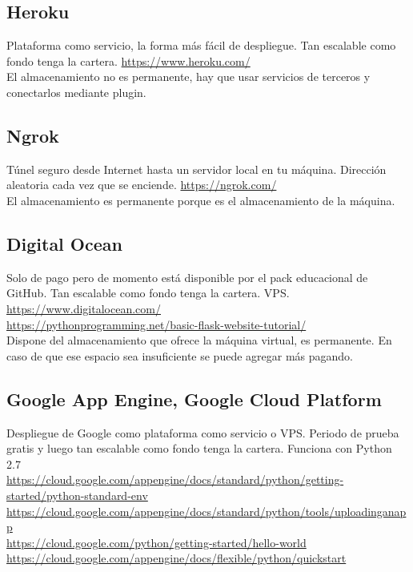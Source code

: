 \subsection{Heroku}
Plataforma como servicio, la forma más fácil de despliegue. Tan escalable como
fondo tenga la cartera. \url{https://www.heroku.com/}\\

El almacenamiento no es permanente, hay que usar servicios de terceros y
conectarlos mediante plugin.
\subsection{Ngrok}
Túnel seguro desde Internet hasta un servidor local en tu máquina. Dirección
aleatoria cada vez que se enciende. \url{https://ngrok.com/}\\

El almacenamiento es permanente porque es el almacenamiento de la máquina.
\subsection{Digital Ocean}
Solo de pago pero de momento está disponible por el pack educacional de GitHub.
Tan escalable como fondo tenga la cartera. VPS.\\
\url{https://www.digitalocean.com/}\\
\url{https://pythonprogramming.net/basic-flask-website-tutorial/}\\

Dispone del almacenamiento que ofrece la máquina virtual, es permanente. En caso
de que ese espacio sea insuficiente se puede agregar más pagando.
\subsection{Google App Engine, Google Cloud Platform}
Despliegue de Google como plataforma como servicio o VPS. Periodo de prueba
gratis y luego tan escalable como fondo tenga la cartera. Funciona con Python
2.7\\
\url{https://cloud.google.com/appengine/docs/standard/python/getting-started/python-standard-env}\\
\url{https://cloud.google.com/appengine/docs/standard/python/tools/uploadinganapp}\\
\url{https://cloud.google.com/python/getting-started/hello-world}\\
\url{https://cloud.google.com/appengine/docs/flexible/python/quickstart}\\

